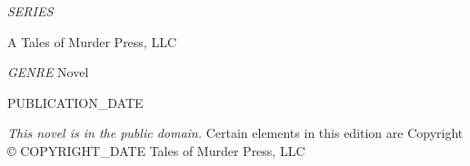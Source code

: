 \documentclass{novel}
\begin{document}
\frontmatter
\thispagestyle{empty}
\begin{parascale}[2]
\vspace*{3\nbs}
\centering{}\par
\centering{}\par
{}\par
\end{parascale}
\clearpage
\thispagestyle{empty}
\null %
\clearpage
\thispagestyle{empty}
\begin{parascale}[4]
\centering{}\par
\centering{}\par
{}\par
\end{parascale}
\vspace*{2\nbs}

\begin{parascale}[1]
\centering\textit{SERIES}\par
\vspace*{3\nbs}
\par
\end{parascale}
\vfill
\begin{parascale}[1]

A Tales of Murder Press, LLC\par
\textit{GENRE} Novel\par
\end{parascale}
\clearpage
\thispagestyle{empty}
\null\vfill
{} PUBLICATION_DATE\par
\null\null
{}\par
\null\null
\vfill
\begin{adjustwidth}{3em}{3em}
\textit{This novel is in the public domain.} Certain \mbox{elements} in this edition are Copyright © COPYRIGHT_DATE Tales of Murder Press, LLC
\end{adjustwidth}
\clearpage
\thispagestyle{empty}
\clearpage %
\thispagestyle{empty}
\begin{toc}[0.5]{0em}
{\centering{}\par}
\null

\end{toc}
\clearpage
\end{document}
